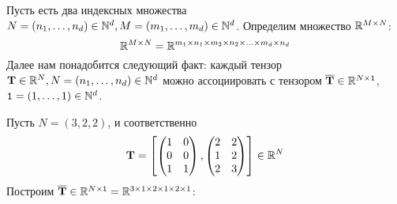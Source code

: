 \documentclass[a4paper, 12pt]{article}
\begin{document}
    Пусть есть два индексных множества $N = (n_1, \ldots, n_d) \in \mathbb{N}^d, M = (m_1, \ldots, m_d) \in \mathbb{N}^d$. Определим множество $\mathbb{R}^{M \times N}$:
    \[
        \mathbb{R}^{M \times N} = \mathbb{R}^{m_1 \times n_1 \times m_2 \times n_2 \times \ldots \times m_d \times n_d}
    \]
    Далее нам понадобится следующий факт: каждый тензор $\mathbf{T} \in \mathbb{R}^N, N = (n_1, \ldots, n_d) \in \mathbb{N}^d$ можно ассоциировать с тензором
    $\overline{\mathbf{T}} \in \mathbb{R}^{N \times \mathtt{1}}$, $\mathtt{1} = (1, \ldots, 1) \in \mathbb{N}^d$.
    \begin{example}
        Пусть $N = (3, 2, 2)$, и соответственно
        \[
            \mathbf{T} = \left[
            \begin{pmatrix}
                1 & 0\\
                0 & 0\\
                1 & 1\\
            \end{pmatrix},
            \begin{pmatrix}
                2 & 2\\
                1 & 2\\
                2 & 3\\
            \end{pmatrix}\right]
            \in \mathbb{R}^N
        \]
        Построим $\overline{\mathbf{T}}\in \mathbb{R}^{N \times \mathtt{1}} = \mathbb{R}^{3 \times 1 \times 2 \times 1 \times 2 \times 1}$:

\end{example}
\end{document}
